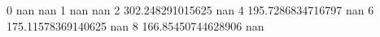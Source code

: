 0 nan nan
1 nan nan
2 302.248291015625 nan
4 195.7286834716797 nan
6 175.11578369140625 nan
8 166.85450744628906 nan
